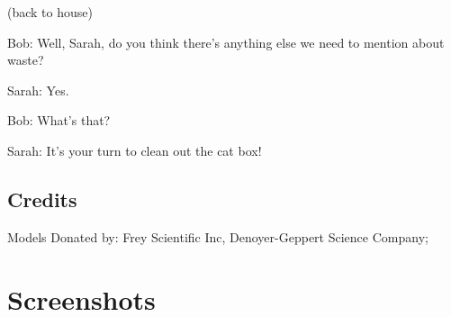 (back to house)

Bob: Well, Sarah, do you think there's anything else we need to mention about waste?

Sarah: Yes.

Bob: What's that?

Sarah: It's your turn to clean out the cat box!

\subsection{Credits}

Models Donated by: Frey Scientific Inc, Denoyer-Geppert Science Company;

\clearpage
\newpage

\section{Screenshots}

